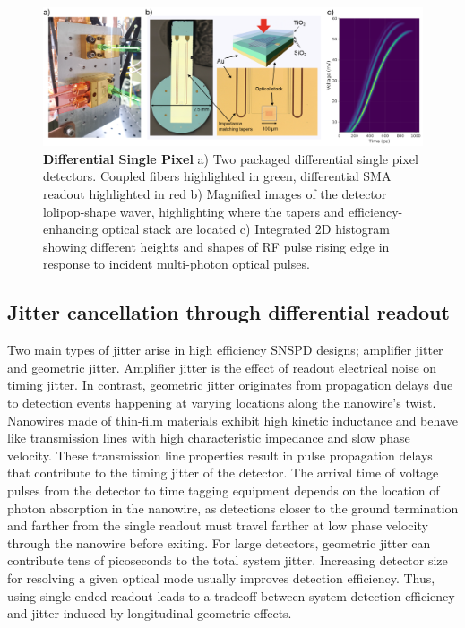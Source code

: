 \documentclass[11pt]{caltech_thesis} %
\begin{document}
\hypertarget{fig:diff}{%
\begin{figure}
\centering
\includegraphics{./chapter_01/figs/diff_light.png}
\caption[{Differential Single Pixel}]{\textbf{Differential Single Pixel} a) Two packaged differential single pixel detectors. Coupled fibers highlighted in green, differential SMA readout highlighted in red b) Magnified images of the detector lolipop-shape waver, highlighting where the tapers and efficiency-enhancing optical stack are located c) Integrated 2D histogram showing different heights and shapes of RF pulse rising edge in response to incident multi-photon optical pulses.}
\label{fig:diff}
\end{figure}
}

\hypertarget{jitter-cancellation-through-differential-readout}{%
\subsection{Jitter cancellation through differential readout}\label{jitter-cancellation-through-differential-readout}}

Two main types of jitter arise in high efficiency SNSPD designs; amplifier jitter and geometric jitter. Amplifier jitter is the effect of readout electrical noise on timing jitter. In contrast, geometric jitter originates from propagation delays due to detection events happening at varying locations along the nanowire's twist. Nanowires made of thin-film materials exhibit high kinetic inductance and behave like transmission lines with high characteristic impedance and slow phase velocity. These transmission line properties result in pulse propagation delays that contribute to the timing jitter of the detector. The arrival time of voltage pulses from the detector to time tagging equipment depends on the location of photon absorption in the nanowire, as detections closer to the ground termination and farther from the single readout must travel farther at low phase velocity through the nanowire before exiting. For large detectors, geometric jitter can contribute tens of picoseconds to the total system jitter. Increasing detector size for resolving a given optical mode usually improves detection efficiency. Thus, using single-ended readout leads to a tradeoff between system detection efficiency and jitter induced by longitudinal geometric effects.
\end{document}
